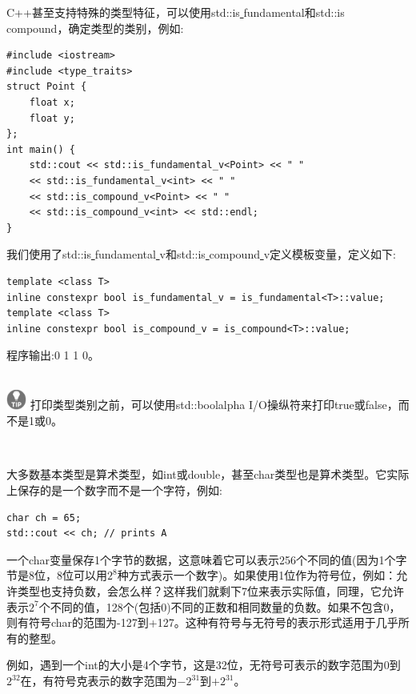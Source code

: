 C++甚至支持特殊的类型特征，可以使用std::is\underline{ }fundamental和std::is\underline{ }compound，确定类型的类别，例如:\par

\begin{lstlisting}[caption={}]
#include <iostream>
#include <type_traits>
struct Point {
	float x;
	float y;
};
int main() {
	std::cout << std::is_fundamental_v<Point> << " "
	<< std::is_fundamental_v<int> << " "
	<< std::is_compound_v<Point> << " "
	<< std::is_compound_v<int> << std::endl;
}
\end{lstlisting}

我们使用了std::is\underline{ }fundamental\underline{ }v和std::is\underline{ }compound\underline{ }v定义模板变量，定义如下: \par

\begin{lstlisting}[caption={}]
template <class T>
inline constexpr bool is_fundamental_v = is_fundamental<T>::value;
template <class T>
inline constexpr bool is_compound_v = is_compound<T>::value;
\end{lstlisting}

程序输出:0 1 1 0。\par

\hspace*{\fill} \\ %
\includegraphics[width=0.05\textwidth]{images/tip}
打印类型类别之前，可以使用std::boolalpha I/O操纵符来打印true或false，而不是1或0。 \par
\noindent\textbf{}\ \par

大多数基本类型是算术类型，如int或double，甚至char类型也是算术类型。它实际上保存的是一个数字而不是一个字符，例如:\par

\begin{lstlisting}[caption={}]
char ch = 65;
std::cout << ch; // prints A
\end{lstlisting}

一个char变量保存1个字节的数据，这意味着它可以表示256个不同的值(因为1个字节是8位，8位可以用$2^8$种方式表示一个数字)。如果使用1位作为符号位，例如：允许类型也支持负数，会怎么样？这样我们就剩下7位来表示实际值，同理，它允许表示$2^7$个不同的值，128个(包括0)不同的正数和相同数量的负数。如果不包含0，则有符号char的范围为-127到+127。这种有符号与无符号的表示形式适用于几乎所有的整型。 \par
例如，遇到一个int的大小是4个字节，这是32位，无符号可表示的数字范围为0到$2^{32}$在，有符号克表示的数字范围为$-2^{31}$到$+2^{31}$。 \par

